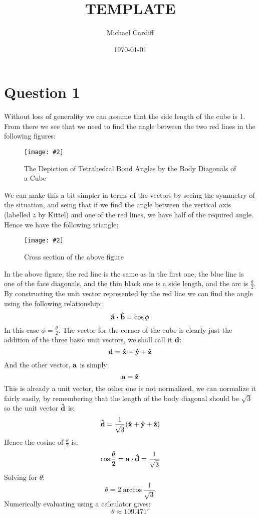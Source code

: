 \documentclass[12pt]{article}
\title{TEMPLATE}
\author{Michael Cardiff}
\date{\today}
\newcommand{\fig}[3]{
  \begin{figure}[H]
    \centering\texttt{[image: \#2]}\caption{#3}
  \end{figure}}
\begin{document}
\maketitle
\section*{Question 1}
Without loss of generality we can assume that the side length of the cube is 1. From there we see that we need to find the angle between the two red lines in the following figures:
\fig{8.0}{tetrahedral.png}{The Depiction of Tetrahedral Bond Angles by the Body Diagonals of a Cube}
We can make this a bit simpler in terms of the vectors by seeing the symmetry of the situation, and seing that if we find the angle between the vertical axis (labelled $z$ by Kittel) and one of the red lines, we have half of the required angle. Hence we have the following triangle:
\fig{5.0}{triangle1.png}{Cross section of the above figure}
In the above figure, the red line is the same as in the first one, the blue line is one of the face diagonals, and the thin black one is a side length, and the arc is $\frac{\theta}{2}$. By constructing the unit vector represented by the red line we can find the angle using the following relationship:
\begin{equation*}
  \vb{\hat{a}}\vdot\vb{\hat{b}}=\cos\phi
\end{equation*}
In this case $\phi=\frac{\theta}{2}$. The vector for the corner of the cube is clearly just the addition of the three basic unit vectors, we shall call it $\vb{d}$:
\begin{equation*}
  \vb{d}=\vb{\hat{x}+\hat{y}+\hat{z}}
\end{equation*}
And the other vector, $\vb{a}$ is simply:
\begin{equation*}
  \vb{a}=\vb{\hat{z}}
\end{equation*}
This is already a unit vector, the other one is not normalized, we can normalize it fairly easily, by remembering that the length of the body diagonal should be $\sqrt{3}$ so the unit vector $\vb{\hat{d}}$ is:
\begin{equation*}
  \vb{\hat{d}}=\frac{1}{\sqrt{3}}\qty(\vb{\hat{x}+\hat{y}+\hat{z}})
\end{equation*}
Hence the cosine of $\frac{\theta}{2}$ is:
\begin{equation*}
  \cos\frac{\theta}{2}=\vb{a}\vdot\vb{\hat{d}}=\frac{1}{\sqrt{3}}
\end{equation*}
Solving for $\theta$:
\begin{equation*}
  \theta=2\arccos\frac{1}{\sqrt{3}}
\end{equation*}
Numerically evaluating using a calculator gives:
\begin{equation*}
  \boxed{\theta\approx109.471^\circ}
\end{equation*}
\end{document}
